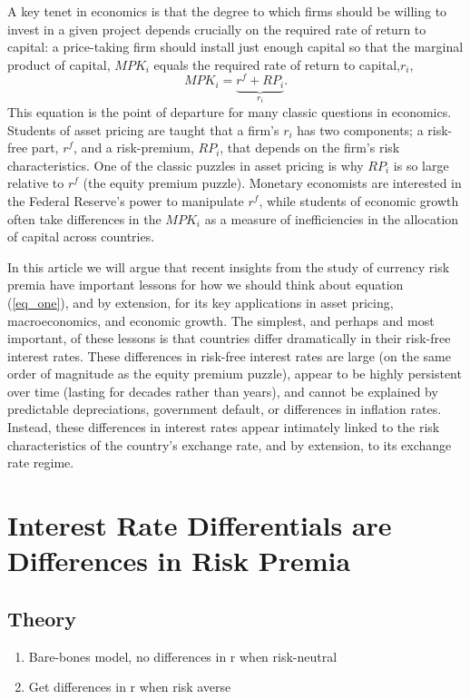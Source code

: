 \documentclass[12pt,letter]{article}
\theoremstyle{break} \theorembodyfont{\normalfont\itshape}
\theoremstyle{break}
\theoremstyle{break} \theorembodyfont{\normalfont\itshape}
\theoremstyle{break} \theorembodyfont{\normalfont\itshape}
\begin{document}
A key tenet in economics is that the degree to which firms should be willing to invest in a given project depends crucially on the required rate of return to capital: a price-taking firm should install just enough capital so that the marginal product of capital, $MPK_i$ equals the required rate of return to capital,$r_i$, \begin{equation}MPK_i=\underbrace{r^f+RP_i}_{ r_i}.\label{eq_one}\end{equation} 
This equation is the point of departure for many classic questions in economics. Students of asset pricing are taught that a firm's $r_i$ has two components; a risk-free part, $r^f$, and a risk-premium, $RP_i$, that depends on the firm's risk characteristics. One of the classic puzzles in asset pricing is why $RP_i$ is so large relative to $r^f$ (the equity premium puzzle). Monetary economists are interested in the Federal Reserve's power to manipulate $r^f$, while students of economic growth often take differences in the $MPK_i$ as a measure of inefficiencies in the allocation of capital across countries.

In this article we will argue that recent insights from the study of currency risk premia have important lessons for how we should think about equation (\ref{eq_one}), and by extension, for its key applications in asset pricing, macroeconomics, and economic growth. The simplest, and perhaps and most important, of these lessons is that countries differ dramatically in their risk-free interest rates. These differences in risk-free interest rates are large (on the same order of magnitude as the equity premium puzzle), appear to be highly persistent over time (lasting for decades rather than years), and cannot be explained by predictable depreciations, government default, or differences in inflation rates. Instead, these differences in interest rates appear intimately linked to the risk characteristics of the country's exchange rate, and by extension, to its exchange rate regime.   




\section{Interest Rate Differentials are Differences in Risk Premia}
\subsection{Theory}
\begin{enumerate}
    \item Bare-bones model, no differences in r when risk-neutral
    \item Get differences in r when risk averse
\end{enumerate}
\end{document}
